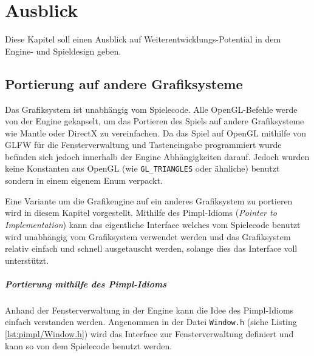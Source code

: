 \documentclass[12pt, a4paper, titlepage, hidelinks]{scrreprt}
\begin{document}
\chapter{Ausblick}

Diese Kapitel soll einen Ausblick auf Weiterentwicklungs-Potential in dem Engine- und Spieldesign geben.

\section{Portierung auf andere Grafiksysteme}

Das Grafiksystem ist unabhängig vom Spielecode. Alle OpenGL-Befehle werde von der Engine gekapselt, um das Portieren des Spiels auf andere Grafiksysteme wie Mantle oder DirectX zu vereinfachen. Da das Spiel auf OpenGL mithilfe von GLFW für die Fensterverwaltung und Tasteneingabe programmiert wurde befinden sich jedoch innerhalb der Engine Abhängigkeiten darauf. Jedoch wurden keine Konstanten aus OpenGL (wie \texttt{GL\_TRIANGLES} oder ähnliche) benutzt sondern in einem eigenem Enum verpackt.


Eine Variante um die Grafikengine auf ein anderes Grafiksystem zu portieren wird in diesem Kapitel vorgestellt. Mithilfe des Pimpl-Idioms (\textit{Pointer to Implementation}) kann das eigentliche Interface welches vom Spielecode benutzt wird unabhängig vom Grafiksystem verwendet werden und das Grafiksystem relativ einfach und schnell ausgetauscht werden, solange dies das Interface voll unterstützt. 

\paragraph{Portierung mithilfe des Pimpl-Idioms}
Anhand der Fensterverwaltung in der Engine kann die Idee des Pimpl-Idioms einfach verstanden werden. Angenommen in der Datei \texttt{Window.h} (siehe Listing \autoref{lst:pimpl/Window.h}) wird das Interface zur Fensterverwaltung definiert und kann so von dem Spielecode benutzt werden.

\end{document}
